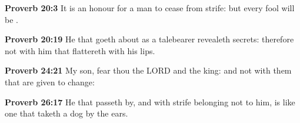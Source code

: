 \begin{compactenum}[1.][10]
	\item \textbf{Proverb 20:3} It is an honour for a man to cease from strife: but every fool will be .
	\item \textbf{Proverb 20:19} He that goeth about as a talebearer revealeth secrets: therefore  not with him that flattereth with his lips.
	\item \textbf{Proverb 24:21} My son, fear thou the LORD and the king: and  not with them that are given to change:
	\item \textbf{Proverb 26:17} He that passeth by, and  with strife belonging not to him, is like one that taketh a dog by the ears.
\end{compactenum}
